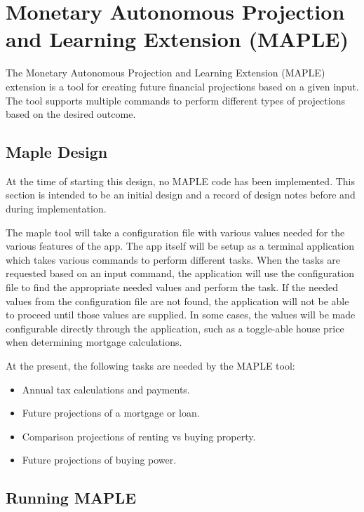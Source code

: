 \chapter{Monetary Autonomous Projection and Learning Extension (MAPLE)}\label{chapter:maple}
\pagestyle{fancy}

The Monetary Autonomous Projection and Learning Extension (MAPLE) extension is a tool for creating future financial projections based on a given input. The tool supports multiple commands to perform different types of projections based on the desired outcome.




\section{Maple Design}

At the time of starting this design, no MAPLE code has been implemented. This section is intended to be an initial design and a record of design notes before and during implementation.

The maple tool will take a configuration file with various values needed for the various features of the app. The app itself will be setup as a terminal application which takes various commands to perform different tasks. When the tasks are requested based on an input command, the application will use the configuration file to find the appropriate needed values and perform the task. If the needed values from the configuration file are not found, the application will not be able to proceed until those values are supplied. In some cases, the values will be made configurable directly through the application, such as a toggle-able house price when determining mortgage calculations.

At the present, the following tasks are needed by the MAPLE tool:
\begin{itemize}\itemsep0em
	\item Annual tax calculations and payments.
	\item Future projections of a mortgage or loan.
	\item Comparison projections of renting vs buying property.
	\item Future projections of buying power.
\end{itemize}



\section{Running MAPLE}

